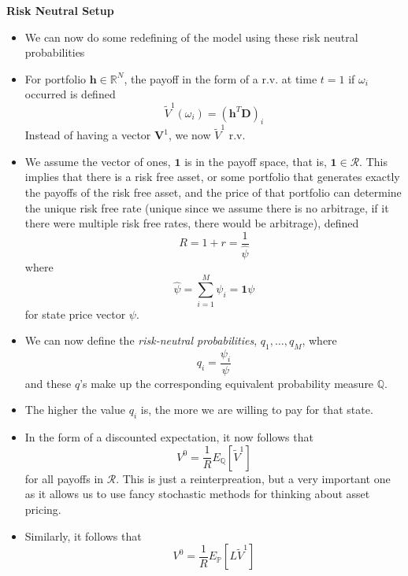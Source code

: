 \documentclass[11pt]{article}
\begin{document}
\textbf{Risk Neutral Setup}
\begin{itemize}
    \item We can now do some redefining of the model using these risk neutral probabilities
    \item For portfolio $\boldsymbol{h} \in \mathbb{R}^N$, the payoff in the form of a r.v. at 
    time $t=1$ if $\omega_i$ occurred is defined 
    \[\tilde{V}^1(\omega_i) = {(\boldsymbol{h}^T \boldsymbol{D})}_i\]
    Instead of having a vector $\boldsymbol{V}^1$, we now $\tilde{V}^1$ r.v.
    \item We assume the vector of ones, $\boldsymbol{1}$ is in the payoff space, that is, 
    $\boldsymbol{1} \in \mathcal{R}$. This implies that there is a risk free asset, or some 
    portfolio that generates exactly the payoffs of the risk free asset, and the price of that
    portfolio can determine the unique risk free rate (unique since we assume there is no 
    arbitrage, if it there were multiple risk free rates, there would be arbitrage), defined 
    \[R = 1 + r = \frac{1}{\hat{\psi}}\] 
    where 
    \[\hat{\psi} = \sum_{i=1}^{M} \psi_i = \boldsymbol{1} \psi\]
    for state price vector $\psi$.
    \item We can now define the \textit{risk-neutral probabilities}, $q_1, \ldots, q_M$, where 
    \[q_i = \frac{\psi_i}{\psi}\]
    and these $q$'s make up the corresponding equivalent probability measure $\mathbb{Q}$.
    \item The higher the value $q_i$ is, the more we are willing to pay for that state. 
    \item In the form of a discounted expectation, it now follows that
    \[V^0 = \frac{1}{R}E_{\mathbb{Q}}[\tilde{V}^1]\]
    for all payoffs in $\mathcal{R}$. This is just a reinterpreation, but a very important one 
    as it allows us to use fancy stochastic methods for thinking about asset pricing. 
    \item Similarly, it follows that 
    \[V^0 = \frac{1}{R}E_{\mathbb{P}}[L\tilde{V}^1]\]
\end{itemize}
\end{document}
